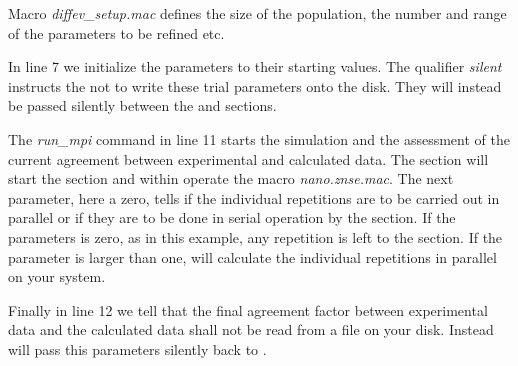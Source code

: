 Macro {\it diffev\_setup.mac} defines the size of the population, the 
number and range of the parameters to be refined etc.

In line 7 we initialize the parameters to their starting values. The 
qualifier {\it silent} instructs the \Suite not to write these 
trial parameters onto the disk. They will instead be passed silently 
between the \Diffev and \Discus sections.

The {\it run\_mpi} command in line 11 starts the simulation and the
assessment of the current agreement between experimental and calculated 
data. The \Diffev section will start the \Discus section and within 
\Discus operate the macro {\it nano.znse.mac}. The next parameter, here a
zero, tells \Diffev if the individual repetitions are to be carried out
in parallel or if they are to be done in serial operation by the 
\Discus section. If the parameters is zero, as in this example, any 
repetition is left to the \Discus section. If the parameter is larger than
one, \Diffev will calculate the individual repetitions in parallel on 
your system.

Finally in line 12 we tell \Diffev that the final agreement factor 
between experimental data and the calculated data shall not be read
from a file on your disk. Instead \Kuplot will pass this parameters
silently back to \diffev.
